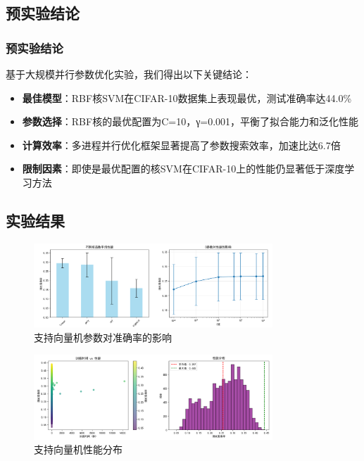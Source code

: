 \documentclass[UTF8]{report}
\theoremstyle{MyLineTheoremStyle} %
\theoremstyle{MyBlockTheoremStyle} %
\theoremstyle{MySubsubsectionStyle} %
\begin{document}
\subsection{预实验结论}

\subsubsection{预实验结论}

基于大规模并行参数优化实验，我们得出以下关键结论：
\begin{itemize}
    \item \textbf{最佳模型}：RBF核SVM在CIFAR-10数据集上表现最优，测试准确率达44.0\%
    \item \textbf{参数选择}：RBF核的最优配置为C=10，γ=0.001，平衡了拟合能力和泛化性能
    \item \textbf{计算效率}：多进程并行优化框架显著提高了参数搜索效率，加速比达6.7倍
    \item \textbf{限制因素}：即使是最优配置的核SVM在CIFAR-10上的性能仍显著低于深度学习方法
\end{itemize}

\subsection{实验结果}

\begin{figure}[H]
    \centering
    \includegraphics[width=0.8\textwidth]{svm1.png}
    \caption{支持向量机参数对准确率的影响}
    \label{fig:svm_confusion_matrix}
\end{figure}

\begin{figure}[H]
    \centering
    \includegraphics[width=0.8\textwidth]{svm2.png}
    \caption{支持向量机性能分布}
    \label{fig:svm_class_accuracy}
\end{figure}
\end{document}
